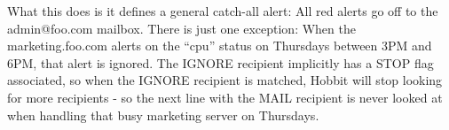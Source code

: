  What this does is it defines a general catch-all alert: All red alerts go off to the admin@foo.com mailbox. There is just one exception: When the marketing.foo.com alerts on the ``cpu'' status on Thursdays between 3PM and 6PM, that alert is ignored. The IGNORE recipient implicitly has a STOP flag associated, so when the IGNORE recipient is matched, Hobbit will stop looking for more recipients - so the next line with the MAIL recipient is never looked at when handling that busy marketing server on Thursdays.


